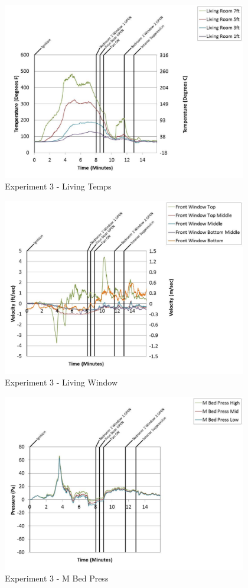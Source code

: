 \documentclass{article}
\begin{document}
\begin{appendices}
	\clearpage

	\begin{figure}[h!]
		\centering
		\includegraphics[height=3.05in]{0_Images/Results_Charts/Exp_3_Charts/LivingTemps.pdf}
		\caption{Experiment 3 - Living Temps}
	\end{figure}
 

	\begin{figure}[h!]
		\centering
		\includegraphics[height=3.05in]{0_Images/Results_Charts/Exp_3_Charts/LivingWindow.pdf}
		\caption{Experiment 3 - Living Window}
	\end{figure}
 
	\clearpage

	\begin{figure}[h!]
		\centering
		\includegraphics[height=3.05in]{0_Images/Results_Charts/Exp_3_Charts/MBedPress.pdf}
		\caption{Experiment 3 - M Bed Press}
	\end{figure}
 


\end{appendices}
\end{document}
